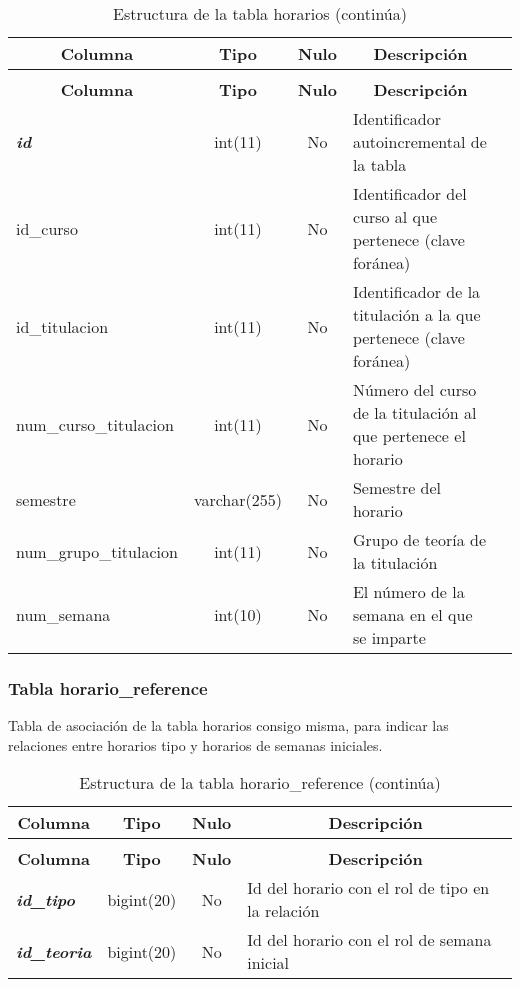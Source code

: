 %
%
 \begin{longtable}{|l|c|c|l|l|} 
 \caption{Estructura de la tabla horarios} \label{tab:horarios-structure} \\
 \hline \multicolumn{1}{|c|}{\textbf{Columna}} & \multicolumn{1}{|c|}{\textbf{Tipo}} & \multicolumn{1}{|c|}{\textbf{Nulo}} & \multicolumn{1}{|c|}{\textbf{Descripción}} \\ \hline \hline
\endfirsthead
 \caption{Estructura de la tabla horarios (continúa)} \\ 
 \hline \multicolumn{1}{|c|}{\textbf{Columna}} & \multicolumn{1}{|c|}{\textbf{Tipo}} & \multicolumn{1}{|c|}{\textbf{Nulo}} & \multicolumn{1}{|c|}{\textbf{Descripción}}  \\ \hline \hline \endhead \endfoot 
\textbf{\textit{id}} & int(11) & No & Identificador autoincremental de la tabla \\ \hline 
id\_curso & int(11) & No & Identificador del curso al que pertenece (clave foránea) \\ \hline 
id\_titulacion & int(11) & No & Identificador de la titulación a la que pertenece (clave foránea)\\ \hline 
num\_curso\_titulacion & int(11) & No & Número del curso de la titulación al que pertenece el horario \\ \hline 
semestre & varchar(255) & No & Semestre del horario\\ \hline 
num\_grupo\_titulacion & int(11) & No & Grupo de teoría de la titulación\\ \hline 
num\_semana & int(10)  & No & El número de la semana en el que se imparte \\ \hline 
 \end{longtable}

\subsubsection{Tabla horario\_reference}
Tabla de asociación de la tabla horarios consigo misma, para indicar las relaciones entre horarios tipo y horarios de semanas iniciales.
%
%
 \begin{longtable}{|l|c|c|l|} 
 \caption{Estructura de la tabla horario\_reference} \label{tab:horario_reference-structure} \\
 \hline \multicolumn{1}{|c|}{\textbf{Columna}} & \multicolumn{1}{|c|}{\textbf{Tipo}} & \multicolumn{1}{|c|}{\textbf{Nulo}} & \multicolumn{1}{|c|}{\textbf{Descripción}} \\ \hline \hline
\endfirsthead
 \caption{Estructura de la tabla horario\_reference (continúa)} \\ 
 \hline \multicolumn{1}{|c|}{\textbf{Columna}} & \multicolumn{1}{|c|}{\textbf{Tipo}} & \multicolumn{1}{|c|}{\textbf{Nulo}} & \multicolumn{1}{|c|}{\textbf{Descripción}} \\ \hline \hline \endhead \endfoot 
\textbf{\textit{id\_tipo}} & bigint(20)  & No & Id del horario con el rol de tipo en la relación \\ \hline 
\textbf{\textit{id\_teoria}} & bigint(20)  & No & Id del horario con el rol de semana inicial \\ \hline 
 \end{longtable}


